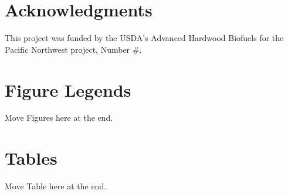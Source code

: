 \documentclass[10pt]{article}
\begin{document}
\section*{Acknowledgments}
This project was funded by the USDA's Advanced Hardwood Biofuels for
the Pacific Northwest project, Number \#.



\section*{Figure Legends}

Move Figures here at the end.

\section*{Tables}

Move Table here at the end.

\end{document}
